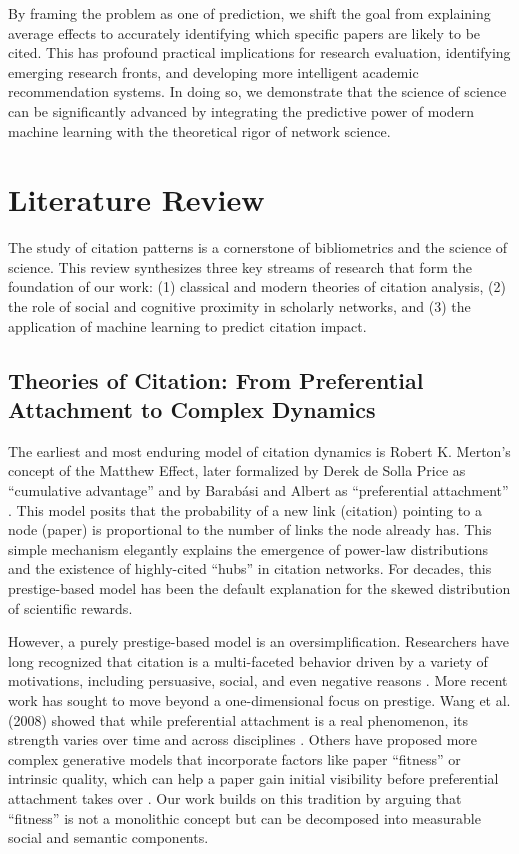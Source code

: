 \documentclass[11pt,a4paper]{article}
\begin{document}
By framing the problem as one of prediction, we shift the goal from explaining average effects to accurately identifying which specific papers are likely to be cited. This has profound practical implications for research evaluation, identifying emerging research fronts, and developing more intelligent academic recommendation systems. In doing so, we demonstrate that the science of science can be significantly advanced by integrating the predictive power of modern machine learning with the theoretical rigor of network science.

\section{Literature Review}
The study of citation patterns is a cornerstone of bibliometrics and the science of science. This review synthesizes three key streams of research that form the foundation of our work: (1) classical and modern theories of citation analysis, (2) the role of social and cognitive proximity in scholarly networks, and (3) the application of machine learning to predict citation impact.

\subsection{Theories of Citation: From Preferential Attachment to Complex Dynamics}
The earliest and most enduring model of citation dynamics is Robert K. Merton's concept of the Matthew Effect, later formalized by Derek de Solla Price as ``cumulative advantage'' and by Barab\'{a}si and Albert as ``preferential attachment'' \cite{merton1968, desollaprice1976, barabasi1999}. This model posits that the probability of a new link (citation) pointing to a node (paper) is proportional to the number of links the node already has. This simple mechanism elegantly explains the emergence of power-law distributions and the existence of highly-cited ``hubs'' in citation networks. For decades, this prestige-based model has been the default explanation for the skewed distribution of scientific rewards.

However, a purely prestige-based model is an oversimplification. Researchers have long recognized that citation is a multi-faceted behavior driven by a variety of motivations, including persuasive, social, and even negative reasons \cite{brooks1985}. More recent work has sought to move beyond a one-dimensional focus on prestige. Wang et al. (2008) showed that while preferential attachment is a real phenomenon, its strength varies over time and across disciplines \cite{wang2008}. Others have proposed more complex generative models that incorporate factors like paper ``fitness'' or intrinsic quality, which can help a paper gain initial visibility before preferential attachment takes over \cite{bianco2008}. Our work builds on this tradition by arguing that ``fitness'' is not a monolithic concept but can be decomposed into measurable social and semantic components.
\end{document}
